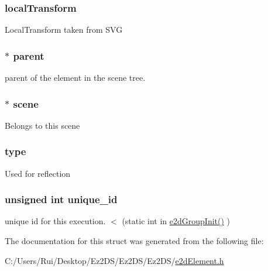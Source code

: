 \hypertarget{structe2d_element_a52bda732df714953f93c1e6f5f7c7c93}{
\subsubsection[{local\-Transform}]{ {\bf local\-Transform}}}\label{structe2d_element_a52bda732df714953f93c1e6f5f7c7c93}
Local\-Transform taken from S\-V\-G \hypertarget{structe2d_element_a3e62eb2fbf1d6bc6d6fe549096a6cee9}{
\subsubsection[{parent}]{$\ast$ {\bf parent}}}\label{structe2d_element_a3e62eb2fbf1d6bc6d6fe549096a6cee9}
parent of the element in the scene tree. \hypertarget{structe2d_element_a0ebd8fae058dd45496c86a2ca317ca9c}{
\subsubsection[{scene}]{$\ast$ {\bf scene}}}\label{structe2d_element_a0ebd8fae058dd45496c86a2ca317ca9c}
Belongs to this scene \hypertarget{structe2d_element_a7df43d7f6c23b61b843acb56eb3ca19a}{
\subsubsection[{type}]{ {\bf type}}}\label{structe2d_element_a7df43d7f6c23b61b843acb56eb3ca19a}
Used for reflection \hypertarget{structe2d_element_a300bb6cf5b184e200523e9bce8346dc4}{
\subsubsection[{unique\-\_\-id}]{\setlength{\rightskip}{0pt plus 5cm}unsigned int {\bf unique\-\_\-id}}}\label{structe2d_element_a300bb6cf5b184e200523e9bce8346dc4}
unique id for this execution. $<$ (static int in \hyperlink{group__e2d_group_ga25406e9ff8a7746af03833e40ccf259a}{e2d\-Group\-Init()} ) 

The documentation for this struct was generated from the following file\-:\begin{DoxyCompactItemize}
\item 
C\-:/\-Users/\-Rui/\-Desktop/\-Ez2\-D\-S/\-Ez2\-D\-S/\-Ez2\-D\-S/\hyperlink{e2d_element_8h}{e2d\-Element.\-h}\end{DoxyCompactItemize}
